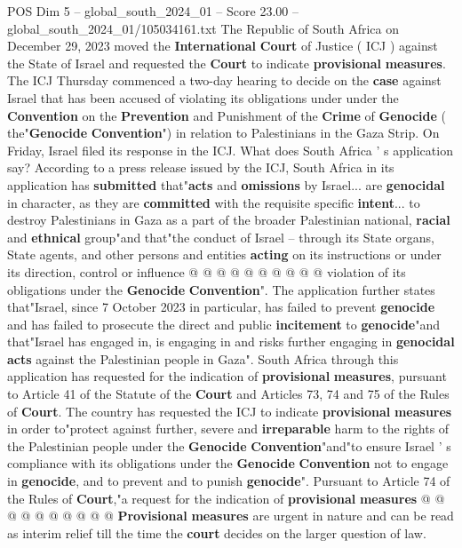 \begin{textsample}{POS Dim 5 – global\_south\_2024\_01 – Score 23.00 – global\_south\_2024\_01/105034161.txt}  \label{ex:f5_pos_002}
The Republic of South Africa on December 29, 2023 moved the \textbf{International} \textbf{Court} of Justice ( ICJ ) against the State of Israel and requested the \textbf{Court} to indicate \textbf{provisional} \textbf{measures}.
The ICJ Thursday commenced a two-day hearing to decide on the \textbf{case} against Israel that has been accused of violating its obligations under under the \textbf{Convention} on the \textbf{Prevention} and Punishment of the \textbf{Crime} of \textbf{Genocide} ( the"\textbf{Genocide} \textbf{Convention}") in relation to Palestinians in the Gaza Strip.
On Friday, Israel filed its response in the ICJ.
What does South Africa ' s application say?
According to a press release issued by the ICJ, South Africa in its application has \textbf{submitted} that"\textbf{acts} and \textbf{omissions} by Israel... are \textbf{genocidal} in character, as they are \textbf{committed} with the requisite specific \textbf{intent}... to destroy Palestinians in Gaza as a part of the broader Palestinian national, \textbf{racial} and \textbf{ethnical} group"and that"the conduct of Israel -- through its State organs, State agents, and other persons and entities \textbf{acting} on its instructions or under its direction, control or influence @ @ @ @ @ @ @ @ @ @ violation of its obligations under the \textbf{Genocide} \textbf{Convention}".
The application further states that"Israel, since 7 October 2023 in particular, has failed to prevent \textbf{genocide} and has failed to prosecute the direct and public \textbf{incitement} to \textbf{genocide}"and that"Israel has engaged in, is engaging in and risks further engaging in \textbf{genocidal} \textbf{acts} against the Palestinian people in Gaza".
South Africa through this application has requested for the indication of \textbf{provisional} \textbf{measures}, pursuant to Article 41 of the Statute of the \textbf{Court} and Articles 73, 74 and 75 of the Rules of \textbf{Court}.
The country has requested the ICJ to indicate \textbf{provisional} \textbf{measures} in order to"protect against further, severe and \textbf{irreparable} harm to the rights of the Palestinian people under the \textbf{Genocide} \textbf{Convention}"and"to ensure Israel ' s compliance with its obligations under the \textbf{Genocide} \textbf{Convention} not to engage in \textbf{genocide}, and to prevent and to punish \textbf{genocide}".
Pursuant to Article 74 of the Rules of \textbf{Court},"a request for the indication of \textbf{provisional} \textbf{measures} @ @ @ @ @ @ @ @ @ @ \textbf{Provisional} \textbf{measures} are urgent in nature and can be read as interim relief till the time the \textbf{court} decides on the larger question of law.

\end{textsample}
